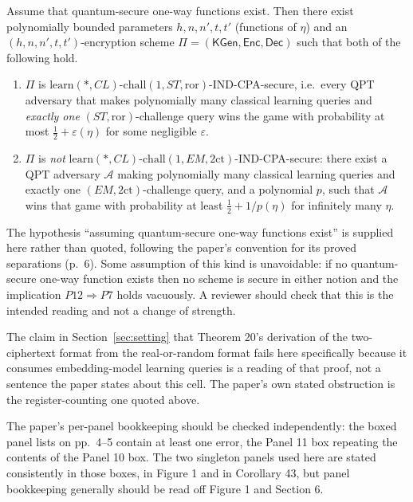 \documentclass{conjura-conjecture}
\newcommand{\KGen}{\mathsf{KGen}}
\newcommand{\Enc}{\mathsf{Enc}}
\newcommand{\Dec}{\mathsf{Dec}}
\newcommand{\ror}{\mathrm{ror}}
\newcommand{\twoct}{2\mathrm{ct}}
\newcommand{\learn}{\mathrm{learn}}
\newcommand{\chall}{\mathrm{chall}}
\newcommand{\NSTror}{\ensuremath{\learn(*,CL)}-\ensuremath{\chall(1,ST,\ror)}}
\newcommand{\NEMtwoct}{\ensuremath{\learn(*,CL)}-\ensuremath{\chall(1,EM,\twoct)}}
\begin{document}
\begin{conjecture}\label{conj:main}
Assume that quantum-secure one-way functions exist. Then there exist
polynomially bounded parameters $h,n,n',t,t'$ (functions of $\eta$) and
an $(h,n,n',t,t')$-encryption scheme $\Pi=(\KGen,\Enc,\Dec)$ such that
both of the following hold.
\begin{enumerate}
  \item $\Pi$ is \NSTror-IND-CPA-secure, i.e.\ every QPT adversary that
    makes polynomially many classical learning queries and \emph{exactly
    one} $(ST,\ror)$-challenge query wins the game with probability at
    most $\tfrac12+\varepsilon(\eta)$ for some negligible $\varepsilon$.
  \item $\Pi$ is \emph{not} \NEMtwoct-IND-CPA-secure: there exist a QPT
    adversary $\mathcal{A}$ making polynomially many classical learning
    queries and exactly one $(EM,\twoct)$-challenge query, and a
    polynomial $p$, such that $\mathcal{A}$ wins that game with
    probability at least $\tfrac12+1/p(\eta)$ for infinitely many
    $\eta$.
\end{enumerate}
\end{conjecture}

\begin{remark}\label{rem:owf}
The hypothesis ``assuming quantum-secure one-way functions exist'' is
supplied here rather than quoted, following the paper's convention for
its proved separations (p.~6). Some assumption of this kind is
unavoidable: if no quantum-secure one-way function exists then no scheme
is secure in either notion and the implication $P12\Rightarrow P7$ holds
vacuously. A reviewer should check that this is the intended reading and
not a change of strength.
\end{remark}

\begin{remark}\label{rem:thm20}
The claim in Section~\ref{sec:setting} that Theorem 20's derivation of
the two-ciphertext format from the real-or-random format fails here
specifically because it consumes embedding-model learning queries is a
reading of that proof, not a sentence the paper states about this cell.
The paper's own stated obstruction is the register-counting one quoted
above.
\end{remark}

\begin{remark}\label{rem:panels}
The paper's per-panel bookkeeping should be checked independently: the
boxed panel lists on pp.~4--5 contain at least one error, the Panel 11
box repeating the contents of the Panel 10 box. The two singleton panels
used here are stated consistently in those boxes, in Figure 1 and in
Corollary 43, but panel bookkeeping generally should be read off
Figure 1 and Section 6.
\end{remark}
\end{document}
